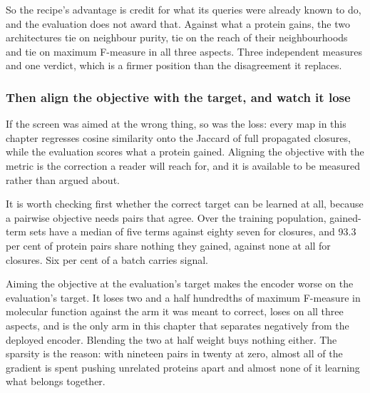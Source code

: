 So the recipe's advantage is credit for what its queries were already known to do, and
the evaluation does not award that. Against what a protein gains, the two architectures
tie on neighbour purity, tie on the reach of their neighbourhoods and tie on maximum
F-measure in all three aspects. Three independent measures and one verdict, which is a
firmer position than the disagreement it replaces.

\subsubsection{Then align the objective with the target, and watch it lose}

If the screen was aimed at the wrong thing, so was the loss: every map in this chapter
regresses cosine similarity onto the Jaccard of full propagated closures, while the
evaluation scores what a protein gained. Aligning the objective with the metric is the
correction a reader will reach for, and it is available to be measured rather than
argued about.

It is worth checking first whether the correct target can be learned at all, because a
pairwise objective needs pairs that agree. Over the training population, gained-term sets
have a median of five terms against eighty seven for closures, and 93.3 per cent of
protein pairs share nothing they gained, against none at all for closures. Six per cent of
a batch carries signal.

\begin{table}[htbp]
  \centering
  \caption{The same map fitted against three targets, with everything else held: same
  seed, same proteins, same passes. Screen is neighbour purity against gained terms on
  the served cell, which is the target the lower two arms were built for.}
  \label{tab:exp14-train-target}
  
\end{table}

Aiming the objective at the evaluation's target makes the encoder worse on the
evaluation's target. It loses two and a half hundredths of maximum F-measure in molecular
function against the arm it was meant to correct, loses on all three aspects, and is the
only arm in this chapter that separates negatively from the deployed encoder. Blending the
two at half weight buys nothing either. The sparsity is the reason: with nineteen pairs in
twenty at zero, almost all of the gradient is spent pushing unrelated proteins apart and
almost none of it learning what belongs together.


